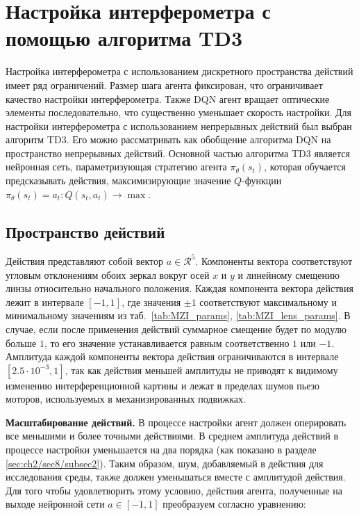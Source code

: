                         
\section{Настройка интерферометра с помощью алгоритма TD3}

Настройка интерферометра с использованием дискретного пространства действий имеет ряд ограничений. Размер шага агента фиксирован, что ограничивает качество настройки интерферометра. Также DQN агент вращает оптические элементы последовательно, что существенно уменьшает скорость настройки. Для настройки интерферометра с использованием непрерывных действий был выбран алгоритм TD3. Его можно рассматривать как обобщение алгоритма DQN на пространство непрерывных действий. Основной частью алгоритма TD3 является нейронная сеть, параметризующая стратегию агента $\pi_{\theta}(s_t)$, которая обучается предсказывать действия, максимизирующие значение $Q$-функции $\pi_{\theta}(s_t) = a_t: Q(s_t, a_t) \to \max$.

\subsection{Пространство действий}

Действия представляют собой вектор $a \in \mathcal{R}^5$. Компоненты вектора соответствуют угловым отклонениям обоих зеркал вокруг осей $x$ и $y$ и линейному смещению линзы относительно начального положения. Каждая компонента вектора действия лежит в интервале $[-1,1]$, где значения $\pm 1$ соответствуют максимальному и минимальному значениям из таб.~\ref{tab:MZI_params}, \ref{tab:MZI_lens_params}. В случае, если после применения действий суммарное смещение будет по модулю больше $1$, то его значение устанавливается равным соответственно $1$ или $-1$.
Амплитуда каждой компоненты вектора действия ограничиваются в интервале $[2.5 \cdot 10^{-3}, 1]$, так как действия меньшей амплитуды не приводят к видимому изменению интерференционной картины и лежат в пределах шумов пьезо моторов, используемых в механизированных подвижках.

\textbf{Масштабирование действий.} 
В процессе настройки агент должен оперировать все меньшими и более точными действиями. В среднем амплитуда действий в процессе настройки уменьшается на два порядка (как показано в разделе \ref{sec:ch2/sec8/subsec2}). Таким образом, шум, добавляемый в действия для исследования среды, также должен уменьшаться вместе с амплитудой действия. Для того чтобы удовлетворить этому условию, действия агента, полученные на выходе нейронной сети  $a\in[-1,1]$ преобразуем согласно уравнению:

